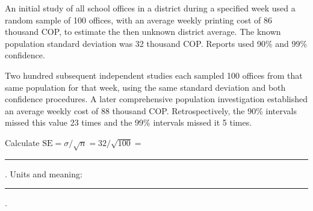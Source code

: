 \clearpage
{}
\vspace{-4mm}
An initial study of all school offices in a district during a specified week used a random sample of 100 offices, with an average weekly printing cost of 86 thousand COP, to estimate the then unknown district average. The known population standard deviation was 32 thousand COP. Reports used 90\% and 99\% confidence.

Two hundred subsequent independent studies each sampled 100 offices from that same population for that week, using the same standard deviation and both confidence procedures. A later comprehensive population investigation established an average weekly cost of 88 thousand COP. Retrospectively, the 90\% intervals missed this value 23 times and the 99\% intervals missed it 5 times.


\par\noindent\begin{minipage}[t]{.49\linewidth}
\vspace{0pt}
\end{minipage}\hfill
\begin{minipage}[t]{.49\linewidth}
\vspace{0pt}
\end{minipage}\par
Calculate $\mathrm{SE}=\sigma/\sqrt n=32/\sqrt{100}=$ \rule{.7in}{.3pt}. Units and meaning: \rule{1.8in}{.3pt}.

